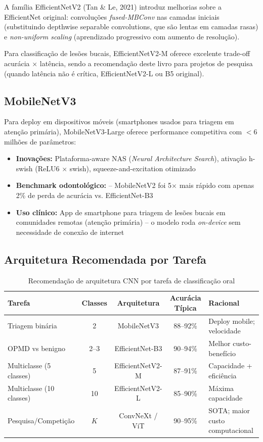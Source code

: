 A família EfficientNetV2 (Tan \& Le, 2021) introduz melhorias sobre a EfficientNet
original: convoluções \textit{fused-MBConv} nas camadas iniciais (substituindo
depthwise separable convolutions, que são lentas em camadas rasas) e
\textit{non-uniform scaling} (aprendizado progressivo com aumento de resolução).

Para classificação de lesões bucais, EfficientNetV2-M oferece excelente trade-off
acurácia $\times$ latência, sendo a recomendação deste livro para projetos de
pesquisa (quando latência não é crítica, EfficientNetV2-L ou B5 original).

\subsection{MobileNetV3}

Para deploy em dispositivos móveis (smartphones usados para triagem em atenção
primária), MobileNetV3-Large oferece performance competitiva com $< 6$ milhões
de parâmetros:

\begin{itemize}
  \item \textbf{Inovações:} Plataforma-aware NAS (\textit{Neural Architecture Search}),
        ativação h-swish (ReLU6 $\times$ swish), squeeze-and-excitation otimizado
  \item \textbf{Benchmark odontológico:}  -- MobileNetV2 foi
        5$\times$ mais rápido com apenas 2\% de perda de acurácia vs. EfficientNet-B3
  \item \textbf{Uso clínico:} App de smartphone para triagem de lesões bucais em
        comunidades remotas (atenção primária) -- o modelo roda \textit{on-device}
        sem necessidade de conexão de internet
\end{itemize}

\subsection{Arquitetura Recomendada por Tarefa}

\begin{table}[H]
  \centering
  \caption{Recomendação de arquitetura CNN por tarefa de classificação oral}
  \label{tab:arch-recommendation}
  \begin{tabularx}{\textwidth}{lcccX}
    \toprule
    \textbf{Tarefa} & \textbf{Classes} & \textbf{Arquitetura} & \textbf{Acurácia Típica} & \textbf{Racional} \\
    \midrule
    Triagem binária & 2 & MobileNetV3 & 88--92\% & Deploy mobile; velocidade \\
    OPMD vs benigno & 2--3 & EfficientNet-B3 & 90--94\% & Melhor custo-benefício \\
    Multiclasse (5 classes) & 5 & EfficientNetV2-M & 87--91\% & Capacidade + eficiência \\
    Multiclasse (10 classes) & 10 & EfficientNetV2-L & 85--90\% & Máxima capacidade \\
    Pesquisa/Competição & $K$ & ConvNeXt / ViT & 90--95\% & SOTA; maior custo computacional \\
    \bottomrule
  \end{tabularx}
\end{table}

